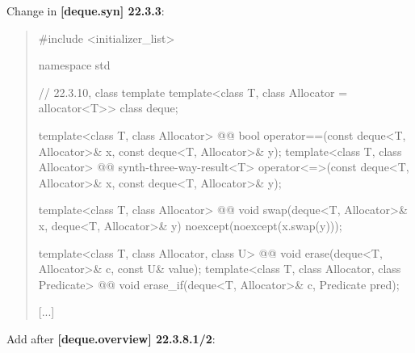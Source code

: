 \documentclass{wg21}
\begin{document}
Change in \textbf{[deque.syn] 22.3.3}:
\begin{quote}
\begin{codeblock}
#include <initializer_list>

namespace std {
  // 22.3.10, class template 
  template<class T, class Allocator = allocator<T>> class deque;

  template<class T, class Allocator>
    @@ bool operator==(const deque<T, Allocator>& x, const deque<T, Allocator>& y);
  template<class T, class Allocator>
    @@ synth-three-way-result<T> operator<=>(const deque<T, Allocator>& x, const deque<T, Allocator>& y);

  template<class T, class Allocator>
    @@ void swap(deque<T, Allocator>& x, deque<T, Allocator>& y)
      noexcept(noexcept(x.swap(y)));
      
  template<class T, class Allocator, class U>
    @@ void erase(deque<T, Allocator>& c, const U& value);
  template<class T, class Allocator, class Predicate>
    @@ void erase_if(deque<T, Allocator>& c, Predicate pred);    

  [...]
}
\end{codeblock}
\end{quote}

Add after \textbf{[deque.overview] 22.3.8.1/2}:
\begin{quote}
\end{quote}
\end{document}
